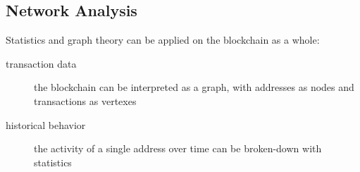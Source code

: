 \subsection{Network Analysis}

Statistics and graph theory can be applied on the blockchain as a whole:

\begin{description}
\item[transaction data]{the blockchain can be interpreted as a graph, with addresses as nodes and transactions as vertexes}
\item[historical behavior]{the activity of a single address over time can be broken-down with statistics}
\end{description}

